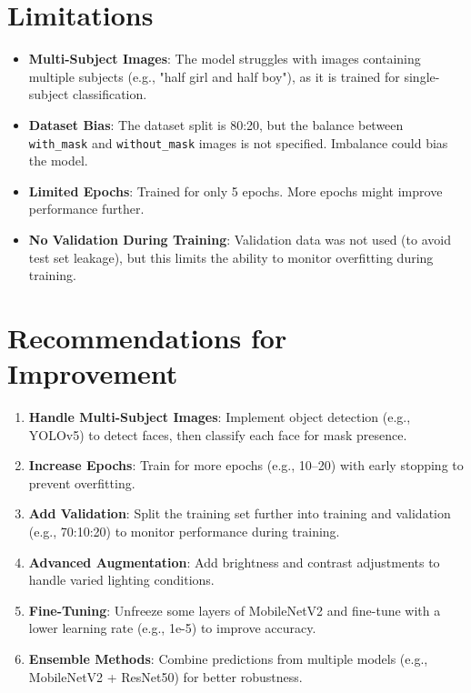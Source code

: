 \documentclass[a4paper,12pt]{article}
\begin{document}
\section{Limitations}
\begin{itemize}
    \item \textbf{Multi-Subject Images}: The model struggles with images containing multiple subjects (e.g., "half girl and half boy"), as it is trained for single-subject classification.
    \item \textbf{Dataset Bias}: The dataset split is 80:20, but the balance between \texttt{with\_mask} and \texttt{without\_mask} images is not specified. Imbalance could bias the model.
    \item \textbf{Limited Epochs}: Trained for only 5 epochs. More epochs might improve performance further.
    \item \textbf{No Validation During Training}: Validation data was not used (to avoid test set leakage), but this limits the ability to monitor overfitting during training.
\end{itemize}

\section{Recommendations for Improvement}
\begin{enumerate}
    \item \textbf{Handle Multi-Subject Images}: Implement object detection (e.g., YOLOv5) to detect faces, then classify each face for mask presence.
    \item \textbf{Increase Epochs}: Train for more epochs (e.g., 10–20) with early stopping to prevent overfitting.
    \item \textbf{Add Validation}: Split the training set further into training and validation (e.g., 70:10:20) to monitor performance during training.
    \item \textbf{Advanced Augmentation}: Add brightness and contrast adjustments to handle varied lighting conditions.
    \item \textbf{Fine-Tuning}: Unfreeze some layers of MobileNetV2 and fine-tune with a lower learning rate (e.g., 1e-5) to improve accuracy.
    \item \textbf{Ensemble Methods}: Combine predictions from multiple models (e.g., MobileNetV2 + ResNet50) for better robustness.
\end{enumerate}
\end{document}
